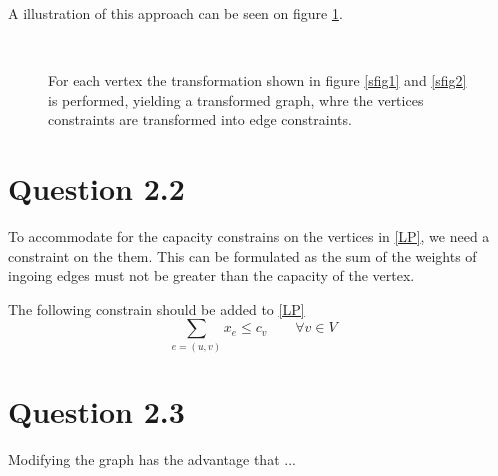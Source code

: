 \documentclass[10pt]{article}
\begin{document}
A illustration of this approach can be seen on figure \ref{fig1}.

\begin{figure}[ht]
\centering
\mbox{
     \quad
}                    
\caption{For each vertex the transformation shown in figure \ref{sfig1} and \ref{sfig2} is performed, yielding a transformed graph, whre the vertices constraints are transformed into edge constraints.}
\label{fig1}
\end{figure}



\section*{Question 2.2} %
\label{sec:question_2_2}
To accommodate for the capacity constrains on the vertices in \eqref{LP}, we need a constraint on the them.
This can be formulated as the sum of the weights of ingoing edges must not be greater than the capacity of the vertex.

The following constrain should be added to \eqref{LP}
\begin{equation}
	\sum_{e=(u,v)} x_e \leq c_v \qquad \forall v \in V \quad 
\end{equation} 

\section*{Question 2.3} %
\label{sec:question_2_3}
Modifying the graph has the advantage that ...
\end{document}
